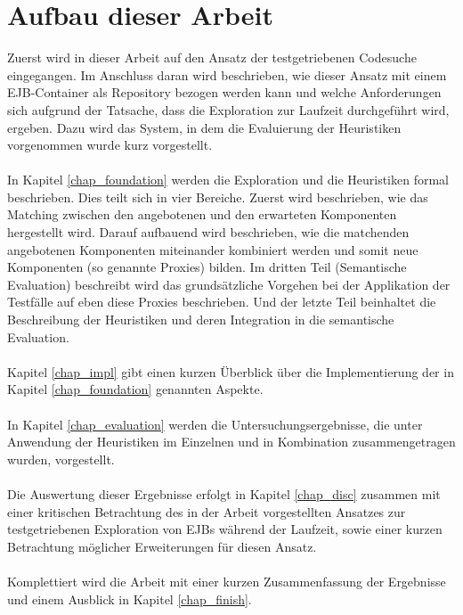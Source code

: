\section{Aufbau dieser Arbeit}
Zuerst wird in dieser Arbeit auf den Ansatz der testgetriebenen Codesuche eingegangen. Im Anschluss daran wird beschrieben, wie dieser Ansatz mit einem EJB-Container als Repository bezogen werden kann und welche Anforderungen sich aufgrund der Tatsache, dass die Exploration zur Laufzeit durchgeführt wird, ergeben. Dazu wird das System, in dem die Evaluierung der Heuristiken vorgenommen wurde kurz vorgestellt.
\\\\
In Kapitel \ref{chap_foundation} werden die Exploration und die Heuristiken formal beschrieben. Dies teilt sich in vier Bereiche. Zuerst wird beschrieben, wie das Matching zwischen den angebotenen und den erwarteten Komponenten  hergestellt wird. Darauf aufbauend wird beschrieben, wie die matchenden angebotenen Komponenten miteinander kombiniert werden und somit neue Komponenten (so genannte Proxies) bilden. Im dritten Teil (Semantische Evaluation) beschreibt wird das grundsätzliche Vorgehen bei der Applikation der Testfälle auf eben diese Proxies beschrieben. Und der letzte Teil beinhaltet die Beschreibung der Heuristiken und deren Integration in die semantische Evaluation.
\\\\
Kapitel \ref{chap_impl} gibt einen kurzen Überblick über die Implementierung der in Kapitel \ref{chap_foundation} genannten Aspekte.
\\\\
In Kapitel \ref{chap_evaluation} werden die Untersuchungsergebnisse, die unter Anwendung der Heuristiken im Einzelnen und in Kombination zusammengetragen wurden, vorgestellt. 
\\\\
Die Auswertung dieser Ergebnisse erfolgt in Kapitel \ref{chap_disc} zusammen mit einer kritischen Betrachtung des in der Arbeit vorgestellten Ansatzes zur testgetriebenen Exploration von EJBs während der Laufzeit, sowie einer kurzen Betrachtung möglicher Erweiterungen für diesen Ansatz.
\\\\
Komplettiert wird die Arbeit mit einer kurzen Zusammenfassung der Ergebnisse und einem Ausblick in Kapitel \ref{chap_finish}.
%